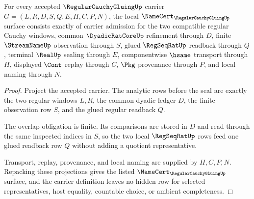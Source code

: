 \begin{theorem}
\label{thm:regular-cauchy-gluing-namecert-obligations}
For every accepted $\RegularCauchyGluingUp$ carrier $G=(L,R,D,S,Q,E,H,C,P,N)$, the local $\NameCert_{\RegularCauchyGluingUp}$ surface consists exactly of carrier admission for the two compatible regular Cauchy windows, common $\DyadicRatCoreUp$ refinement through $D$, finite $\StreamNameUp$ observation through $S$, glued $\RegSeqRatUp$ readback through $Q$, terminal $\RealUp$ sealing through $E$, componentwise $\hsame$ transport through $H$, displayed $\Cont$ replay through $C$, $\Pkg$ provenance through $P$, and local naming through $N$.
\end{theorem}
\begin{proof}
Project the accepted carrier. The analytic rows before the seal are exactly the two regular windows $L,R$, the common dyadic ledger $D$, the finite observation row $S$, and the glued regular readback $Q$.

The overlap obligation is finite. Its comparisons are stored in $D$ and read through the same inspected indices in $S$, so the two local $\RegSeqRatUp$ rows feed one glued readback row $Q$ without adding a quotient representative.

Transport, replay, provenance, and local naming are supplied by $H,C,P,N$. Repacking these projections gives the listed $\NameCert_{\RegularCauchyGluingUp}$ surface, and the carrier definition leaves no hidden row for selected representatives, host equality, countable choice, or ambient completeness.
\end{proof}

